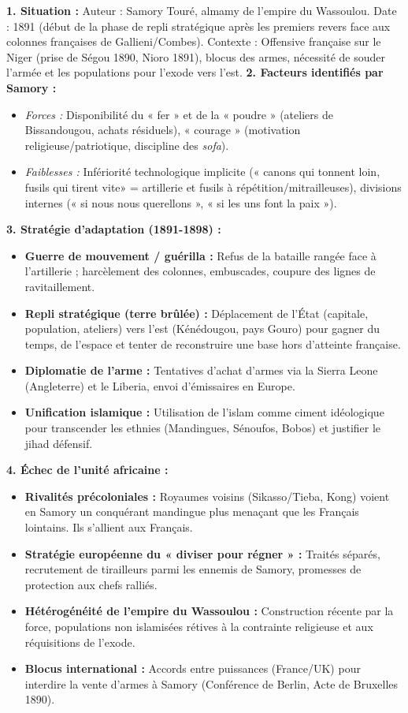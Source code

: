 \documentclass[11pt]{article}
\begin{document}
\begin{corrige}
\textbf{1. Situation :} Auteur : Samory Touré, almamy de l'empire du Wassoulou. Date : 1891 (début de la phase de repli stratégique après les premiers revers face aux colonnes françaises de Gallieni/Combes). Contexte : Offensive française sur le Niger (prise de Ségou 1890, Nioro 1891), blocus des armes, nécessité de souder l'armée et les populations pour l'exode vers l'est.
\textbf{2. Facteurs identifiés par Samory :}
\begin{itemize}
    \item \textit{Forces :} Disponibilité du « fer » et de la « poudre » (ateliers de Bissandougou, achats résiduels), « courage » (motivation religieuse/patriotique, discipline des \emph{sofa}).
    \item \textit{Faiblesses :} Infériorité technologique implicite (« canons qui tonnent loin, fusils qui tirent vite» = artillerie et fusils à répétition/mitrailleuses), divisions internes (« si nous nous querellons », « si les uns font la paix »).
\end{itemize}
\textbf{3. Stratégie d'adaptation (1891-1898) :}
\begin{itemize}
    \item \textbf{Guerre de mouvement / guérilla :} Refus de la bataille rangée face à l'artillerie ; harcèlement des colonnes, embuscades, coupure des lignes de ravitaillement.
    \item \textbf{Repli stratégique (terre brûlée) :} Déplacement de l'État (capitale, population, ateliers) vers l'est (Kénédougou, pays Gouro) pour gagner du temps, de l'espace et tenter de reconstruire une base hors d'atteinte française.
    \item \textbf{Diplomatie de l'arme :} Tentatives d'achat d'armes via la Sierra Leone (Angleterre) et le Liberia, envoi d'émissaires en Europe.
    \item \textbf{Unification islamique :} Utilisation de l'islam comme ciment idéologique pour transcender les ethnies (Mandingues, Sénoufos, Bobos) et justifier le jihad défensif.
\end{itemize}
\textbf{4. Échec de l'unité africaine :}
\begin{itemize}
    \item \textbf{Rivalités précoloniales :} Royaumes voisins (Sikasso/Tieba, Kong) voient en Samory un conquérant mandingue plus menaçant que les Français lointains. Ils s'allient aux Français.
    \item \textbf{Stratégie européenne du « diviser pour régner » :} Traités séparés, recrutement de tirailleurs parmi les ennemis de Samory, promesses de protection aux chefs ralliés.
    \item \textbf{Hétérogénéité de l'empire du Wassoulou :} Construction récente par la force, populations non islamisées rétives à la contrainte religieuse et aux réquisitions de l'exode.
    \item \textbf{Blocus international :} Accords entre puissances (France/UK) pour interdire la vente d'armes à Samory (Conférence de Berlin, Acte de Bruxelles 1890).
\end{itemize}
\end{corrige}
\end{document}

